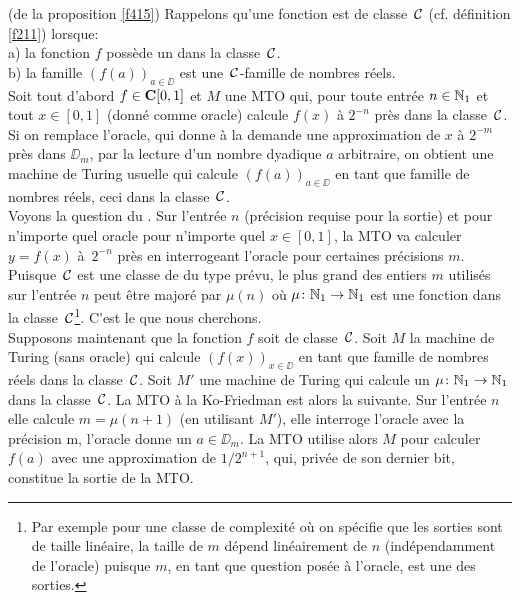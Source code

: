 \proof (de la proposition \ref{f415})
Rappelons qu'une fonction est \uni de classe~${{\cal C}}$   (cf. définition 
\ref{f211}) lorsque:\\
a)	la fonction $f$ possède un \mcu dans la classe~${{\cal C}}$.\\
b)	la famille   $(f(a))_{a \in \DD}$   est une~${{\cal C}}$-famille de nombres 
réels.\\
Soit tout d'abord  $f \in {{\bf C}[0,1]}$ et   $M$  une  MTO  qui, pour toute entrée  
$n \in \mathbb {N}_1$ et tout  $x \in [0,1]$   (donné comme oracle) calcule  $f(x)$  
à  $2^{-n}$   près dans la classe~${{\cal C}}$.  Si on remplace l'oracle, qui 
donne à la demande une approximation de $x$ à   $2^{-m}$  près dans  
$\DD_{m}$,  par la lecture d'un nombre dyadique  $a$  arbitraire, on obtient 
une machine de Turing usuelle qui calcule  $(f(a))_{a \in \DD}$   en tant que 
famille de nombres réels, ceci dans la classe~${{\cal C}}$. \\
Voyons la question du \mcu. Sur l'entrée  $n$  (précision requise pour la 
sortie) et pour n'importe quel oracle pour n'importe quel  $x \in [0,1]$, la MTO 
va calculer  $y=f(x)$  à~$2^{-n}$  près en interrogeant l'oracle pour 
certaines précisions  $m$. Puisque~${{\cal C}}$   est une classe de \com du type 
prévu, le plus grand des entiers  $m$  utilisés sur l'entrée  $n$  peut 
être majoré par $\mu(n)$ où $\mu\colon  \mathbb {N}_1 \rightarrow  \mathbb {N}_1$  est une 
fonction dans la classe~${{\cal C}}${\footnote{Par exemple pour une classe de 
complexité où on spécifie que les sorties sont de taille linéaire,  la 
taille de $m$ dépend linéairement de $n$ (indépendamment de l'oracle) 
puisque $m$, en tant que question posée à l'oracle, est une des sorties.}}. 
C'est le \mcu que nous cherchons.\\
Supposons maintenant que la fonction $f$ soit  \uni de classe~${{\cal C}}$.
 Soit  $M$  la machine de Turing (sans oracle) qui calcule  
$(f(x))_{x \in \DD}$   en tant que famille de nombres réels dans la classe~${{\cal C}}$.            
Soit  $M'$ une machine de Turing qui calcule un \mcu  $\mu \colon  \mathbb {N}_1 \rightarrow 
\mathbb {N}_1$  dans la classe~${{\cal C}}$. La MTO à la Ko-Friedman est alors la suivante. 
Sur l'entrée  $n$  elle calcule  $m = \mu(n+1)$  (en utilisant  $M'$), elle 
interroge l'oracle avec la précision  m, l'oracle donne un 
\elem  $a \in \DD_m$. La MTO utilise alors  $M$  pour calculer  $f(a)$  avec 
une approximation de $1/2^{n+1}$, qui, privée de son dernier bit, constitue la 
sortie de la MTO. \eop  

